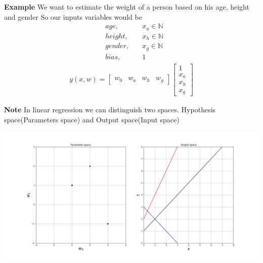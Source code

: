 \documentclass[main.tex]{subfiles}
\begin{document}
\textbf{Example} We want to estimate the weight of a person based on his age, height and gender
So our inputs variables would be
\begin{align*}
    &age,\quad &x_a\in \mathbb{N} \\
    &height,\quad &x_h\in \mathbb{N} \\
    &gender, \quad &x_g\in \mathbb{N} \\
    &bias, \quad &1
\end{align*}
\begin{align*}
    y(x,w)=
    \begin{bmatrix}w_0 & w_a & w_h & w_g\end{bmatrix}
    \begin{bmatrix}1\\ x_a \\ x_h \\x_g\end{bmatrix}
\end{align*}

\textbf{Note} In linear regression we can distinguish two spaces. Hypothesis space(Parameters space) and Output space(Input space)

\begin{center}
    \includegraphics[scale=0.4]{img/param_input_space.jpg}
\end{center}
\end{document}
